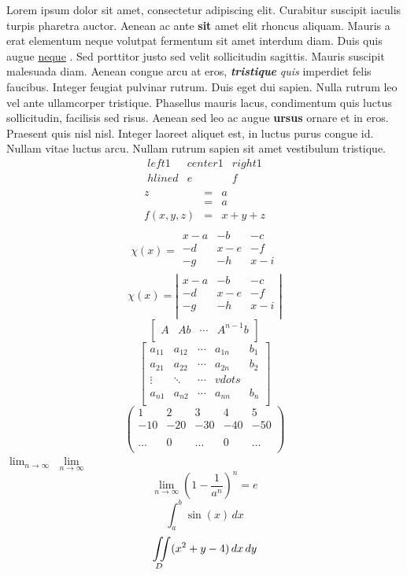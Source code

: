 \documentclass[12pt]{article}
\begin{document}
Lorem ipsum dolor sit amet, consectetur adipiscing elit. Curabitur suscipit iaculis turpis pharetra auctor. Aenean ac ante \textbf{sit} 
amet elit rhoncus aliquam. Mauris a erat elementum neque volutpat fermentum sit amet interdum diam. Duis quis augue \underline{neque} .
Sed porttitor justo sed velit sollicitudin sagittis. Mauris suscipit malesuada diam. Aenean congue arcu at eros, \textbf{\textit{tristique}}
\emph{quis} imperdiet felis faucibus. Integer feugiat pulvinar rutrum. Duis eget dui sapien. Nulla rutrum leo vel ante ullamcorper 
tristique. Phasellus mauris lacus, condimentum quis luctus sollicitudin, facilisis sed risus. Aenean sed leo ac augue 
\textbf{ursus} ornare et in eros. Praesent quis nisl nisl. Integer laoreet aliquet est, in luctus purus congue id. Nullam 
vitae luctus arcu. Nullam rutrum sapien sit amet vestibulum tristique.
$$
\begin{array}{|l|cr}
left1 & center 1 & right 1 \\ hline
d & e & f \\
\end{array}
$$
$$
\begin{array}{lll}
z &=& a \\
	&=& a\\
f(x,y,z) &=& x+y+z \\
\end{array}
$$
$$
\chi(x)=
\begin{array}{ccc}
x-a & -b & -c \\
-d & x-e & -f \\
-g & -h & x-i \\
\end{array}
$$
$$
\chi(x)=\left|
\begin{array}{ccc}
x-a & -b & -c \\
-d & x-e & -f \\
-g & -h & x-i \\
\end{array} \right|
$$
$$
\left[
\begin{array}{c|c|c|c}
A & Ab & \cdots & A^{n-1} b\\
\end{array}
\right]
$$
$$
\left[
\begin{array}{cccc|c}
a_{11} & a_{12} & \cdots & a_{1n} & b_1 \\
a_{21} & a_{22} & \cdots & a_{2n} & b_2 \\
\vdots & \ddots & \cdots & vdots &  \\
a_{n1} & a_{n2} & \cdots & a_{nn} & b_n \\
\end{array}
\right]
$$
$$
\left(
\begin{array}{ccccc}
1 & 2 & 3 & 4 &5 \\
-10 & -20 & -30 & -40 & -50 \\
\\
\ldots & 0 & \ldots & 0  & \ldots \\
\end{array}
\right)
$$
$\lim_{n \to \infty}$
$\lim\limits _{n \to \infty}$
$$\lim _{n \to \infty}
\left(
1-\frac{1}{a^n}
\right)^n=e
$$
$$
\int _a^b \sin(x) \, dx
$$
$$
\iint\displaylimits _D(x^2+y-4) \, dx \, dy
$$
\end{document}

